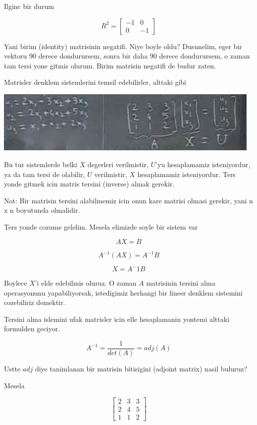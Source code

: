 \documentclass[12pt,fleqn]{article}\usepackage{../common}
\begin{document}
Ilginc bir durum

\[ R^2 =
\left[\begin{array}{rr}
-1 & 0 \\
0 & -1
\end{array}\right]
 \]

Yani birim (identity) matrisinin negatifi. Niye boyle oldu? Dusunelim, eger
bir vektoru 90 derece dondurursem, sonra bir daha 90 derece dondurursem, o
zaman tam tersi yone gitmis olurum. Birim matrisin negatifi de budur
zaten. 

Matrisler denklem sistemlerini temsil edebilirler, alttaki gibi

\includegraphics[height=3cm]{3_5.png}

Bu tur sistemlerde belki $X$ degerleri verilmistir, $U$'yu hesaplamamiz
isteniyordur, ya da tam tersi de olabilir, $U$ verilmistir, $X$
hesaplamamiz isteniyordur. Ters yonde gitmek icin matris tersini (inverse)
almak gerekir.

Not: Bir matrisin tersini alabilmemiz icin onun kare matrisi olmasi gerekir,
yani n x n boyutunda olmalidir. 

Ters yonde cozume gelelim. Mesela elimizde soyle bir sistem var

\[  AX = B\]

\[  A^{-1}(AX) = A^{-1}B\]

\[  X = A^{-}1B\]

Boylece $X$'i elde edebilmis oluruz. O zaman $A$ matrisinin tersini alma
operasyonunu yapabiliyorsak, istedigimiz herhangi bir lineer denklem
sistemini cozebiliriz demektir. 

Tersini alma islemini ufak matrisler icin elle hesaplamanin yontemi alttaki
formulden geciyor. 

\[ A^{-1} = \frac{1}{det(A)}  = adj(A)\]

Ustte $adj$ diye tanimlanan bir matrisin bitisigini (adjoint matrix) nasil
buluruz?

Mesela

\[ 
\left[\begin{array}{rrr}
2 & 3 & 3 \\
2 & 4 & 5 \\
1 & 1 & 2
\end{array}\right]
 \]
\end{document}
